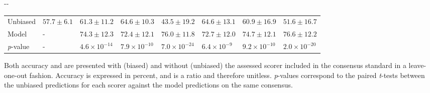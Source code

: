 \begin{table}[t]
\begin{adjustwidth*}{}{-\marginparwidth-\marginparsep}
\begin{threeparttable}
\begin{tabular}{@{}llllllll@{}}
        \quad Unbiased                     & $57.7\pm6.1$ & $61.3\pm11.2$          & $64.6\pm10.3$          & $43.5\pm19.2$           & $64.6\pm13.1$         & $60.9\pm16.9$          & $51.6\pm16.7$           \\
        \quad Model                        & -            & $74.3\pm12.3$          & $72.4\pm12.1$          & $76.0\pm11.8$           & $72.7\pm12.0$         & $74.7\pm12.1$          & $76.6\pm12.2$           \\
        \textit{p}-value & -            & $4.6\times10^{-14}$ & $7.9\times10^{-10}$ & $7.0\times10^{-24}$ & $6.4\times10^{-9}$ & $9.2\times10^{-10}$ & $2.0\times10^{-20}$ \\ \bottomrule
    \end{tabular}
    \begin{tablenotes}
    \small \item Both accuracy and \cohen are presented with (biased) and without (unbiased) the assessed scorer included in the consensus standard in a leave-one-out fashion. Accuracy is expressed in percent, and \cohen is a ratio and therefore unitless. \textit{p}-values correspond to the paired \textit{t}-tests between the unbiased predictions for each scorer against the model predictions on the same consensus.
    \end{tablenotes}
\end{threeparttable}
\end{adjustwidth*}
\end{table}

